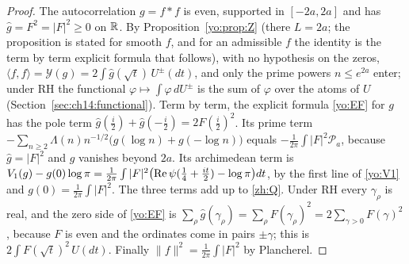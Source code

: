 \begin{proof}
The autocorrelation $g=f*f$ is even, supported in $[-2a,2a]$ and has $\widehat g=F^2=|F|^2\ge0$ on $\mathbb{R}$. By Proposition~\ref{yo:prop:Z} (there $L=2a$; the proposition is stated for smooth $f$, and for an admissible $f$ the identity is the term by term explicit formula that follows), with no hypothesis on the zeros, $\langle f,f\rangle=\mathcal Y(g)=2\int\widehat g(\sqrt t)\,U^\pm(dt)$, and only the prime powers $n\le e^{2a}$ enter; under RH the functional $\varphi\mapsto\int\varphi\,dU^\pm$ is the sum of $\varphi$ over the atoms of $U$ (Section~\ref{sec:ch14:functional}). Term by term, the explicit formula \eqref{yo:EF} for $g$ has the pole term $\widehat g(\frac i2)+\widehat g(-\frac i2)=2F(\frac i2)^2$. Its prime term $-\sum_{n\ge2}\Lambda(n)n^{-1/2}\bigl(g(\log n)+g(-\log n)\bigr)$ equals $-\frac1{2\pi}\int|F|^2\mathcal P_a$, because $\widehat g=|F|^2$ and $g$ vanishes beyond $2a$. Its archimedean term is $V_1(g)-g(0)\log\pi=\frac1{2\pi}\int|F|^2\bigl(\operatorname{Re}\psi(\frac14+\frac{it}2)-\log\pi\bigr)dt$, by the first line of \eqref{yo:V1} and $g(0)=\frac1{2\pi}\int|F|^2$. The three terms add up to \eqref{zh:Q}. Under RH every $\gamma_\rho$ is real, and the zero side of \eqref{yo:EF} is $\sum_\rho\widehat g(\gamma_\rho)=\sum_\rho F(\gamma_\rho)^2=2\sum_{\gamma>0}F(\gamma)^2$, because $F$ is even and the ordinates come in pairs $\pm\gamma$; this is $2\int F(\sqrt t)^2\,U(dt)$. Finally $\|f\|^2=\frac1{2\pi}\int|F|^2$ by Plancherel.
\end{proof}

